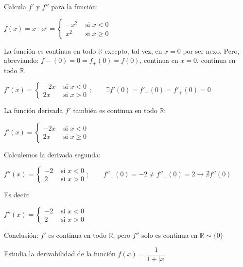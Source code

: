 \begin{ejre} Calcula $f'$ y $f''$ para la función:
	
	$f(x)=x\cdot |x|=
	\begin{cases}
		-x^2 & \mbox { si } x<0 \\
		x^2  & \mbox { si } x\ge 0
	\end{cases}$	
	\end{ejre}
	
	\begin{proofw}\renewcommand{\qedsymbol}{$\diamond$}
	La función es continua en todo $\mathbb R$ excepto, tal vez, en $x=0$ por ser nexo. Pero, abreviando: $f-(0)=0=f_+(0)=f(0)$, continua en $x=0$, continua en todo $\mathbb R$.
	
	$f'(x)=
		\begin{cases}
		-2x & \mbox{ si } x< 0 \\
		2x & \mbox{ si } x >0  
		\end{cases} ; \qquad  \exists f'(0)=f'_-(0)=f'_+(0)=0$
		
		La función derivada $f'$ también es continua en todo $\mathbb R$:
		
	$f'(x)=
		\begin{cases}
		-2x & \mbox{ si } x< 0 \\
		2x & \mbox{ si } x \ge0  
		\end{cases}$	
		
		Calculemos la derivada segunda:
		
	$f''(x)=
		\begin{cases}
		-2 & \mbox{ si } x< 0 \\
		2 & \mbox{ si } x >0  
		\end{cases} ; \qquad   f''_-(0)=-2 \neq f''_+(0)=2 \to \nexists f''(0)$	
		
		Es decir:
		
		$f''(x)=
		\begin{cases}
		-2 & \mbox{ si } x< 0 \\
		2 & \mbox{ si } x >0  
		\end{cases}$
		
		Conclusión: $f'$ es continua en todo $\mathbb R$, pero $f''$ solo es continua en $\mathbb R \sim \{0\}$
	
	\end{proofw}
	
	\begin{ejre} 	Estudia la derivabilidad de la función 
	$f(x)=\dfrac 1 {1+|x|}$
	\end{ejre}
	
